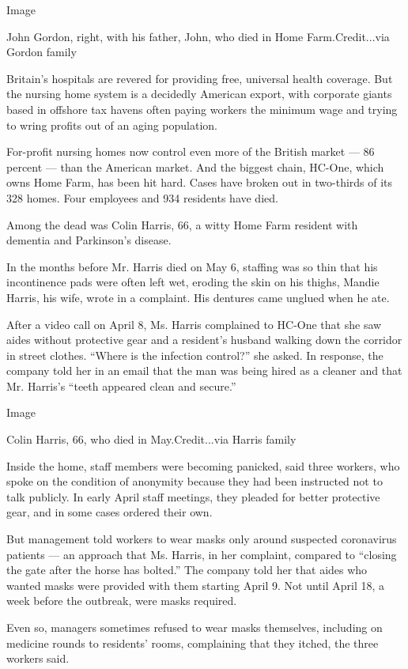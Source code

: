 Image

John Gordon, right, with his father, John, who died in Home
Farm.Credit...via Gordon family

Britain's hospitals are revered for providing free, universal health
coverage. But the nursing home system is a decidedly American export,
with corporate giants based in offshore tax havens often paying workers
the minimum wage and trying to wring profits out of an aging population.

For-profit nursing homes now control even more of the British market ---
86 percent --- than the American market. And the biggest chain, HC-One,
which owns Home Farm, has been hit hard. Cases have broken out in
two-thirds of its 328 homes. Four employees and 934 residents have died.

Among the dead was Colin Harris, 66, a witty Home Farm resident with
dementia and Parkinson's disease.

In the months before Mr. Harris died on May 6, staffing was so thin that
his incontinence pads were often left wet, eroding the skin on his
thighs, Mandie Harris, his wife, wrote in a complaint. His dentures came
unglued when he ate.

After a video call on April 8, Ms. Harris complained to HC-One that she
saw aides without protective gear and a resident's husband walking down
the corridor in street clothes. ``Where is the infection control?'' she
asked. In response, the company told her in an email that the man was
being hired as a cleaner and that Mr. Harris's ``teeth appeared clean
and secure.''

Image

Colin Harris, 66, who died in May.Credit...via Harris family

Inside the home, staff members were becoming panicked, said three
workers, who spoke on the condition of anonymity because they had been
instructed not to talk publicly. In early April staff meetings, they
pleaded for better protective gear, and in some cases ordered their own.

But management told workers to wear masks only around suspected
coronavirus patients --- an approach that Ms. Harris, in her complaint,
compared to ``closing the gate after the horse has bolted.'' The company
told her that aides who wanted masks were provided with them starting
April 9. Not until April 18, a week before the outbreak, were masks
required.

Even so, managers sometimes refused to wear masks themselves, including
on medicine rounds to residents' rooms, complaining that they itched,
the three workers said.

